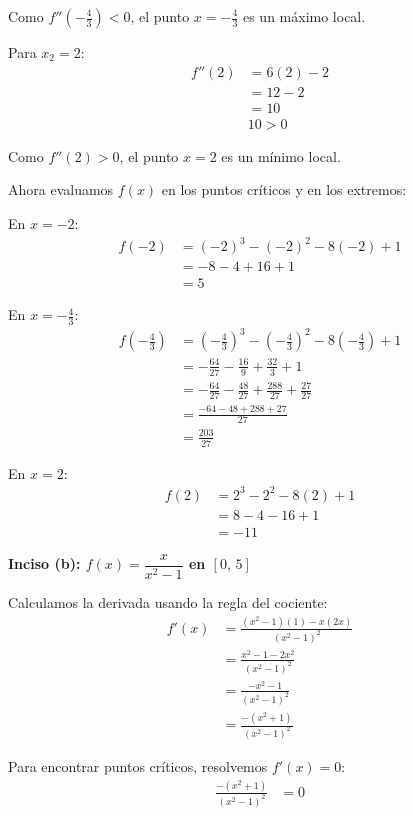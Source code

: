 \documentclass{article}
\begin{document}
Como $f''(-\frac{4}{3}) < 0$, el punto $x = -\frac{4}{3}$ es un máximo local.

Para $x_2 = 2$:
\begin{align}
f''(2) &= 6(2) - 2 \\
&= 12 - 2 \\
&= 10 \\
&10> 0
\end{align}

Como $f''(2) > 0$, el punto $x = 2$ es un mínimo local.

Ahora evaluamos $f(x)$ en los puntos críticos y en los extremos:

En $x = -2$:
\begin{align}
f(-2) &= (-2)^{3} - (-2)^{2} - 8(-2) + 1 \\
&= -8 - 4 + 16 + 1 \\
&= 5
\end{align}

En $x = -\frac{4}{3}$:
\begin{align}
f\left(-\frac{4}{3}\right) &= \left(-\frac{4}{3}\right)^{3} - \left(-\frac{4}{3}\right)^{2} - 8\left(-\frac{4}{3}\right) + 1 \\
&= -\frac{64}{27} - \frac{16}{9} + \frac{32}{3} + 1 \\
&= -\frac{64}{27} - \frac{48}{27} + \frac{288}{27} + \frac{27}{27} \\
&= \frac{-64 - 48 + 288 + 27}{27} \\
&= \frac{203}{27}
\end{align}

En $x = 2$:
\begin{align}
f(2) &= 2^{3} - 2^{2} - 8(2) + 1 \\
&= 8 - 4 - 16 + 1 \\
&= -11
\end{align}


\textbf{Inciso (b): $f(x) = \dfrac{x}{x^{2}-1}$ en $[0,\,5]$}

Calculamos la derivada usando la regla del cociente:
\begin{align}
f'(x) &= \frac{(x^{2}-1)(1) - x(2x)}{(x^{2}-1)^{2}} \\
&= \frac{x^{2} - 1 - 2x^{2}}{(x^{2}-1)^{2}} \\
&= \frac{-x^{2} - 1}{(x^{2}-1)^{2}} \\
&= \frac{-(x^{2} + 1)}{(x^{2}-1)^{2}}
\end{align}

Para encontrar puntos críticos, resolvemos $f'(x) = 0$:
\begin{align}
\frac{-(x^{2} + 1)}{(x^{2}-1)^{2}} &= 0
\end{align}
\end{document}

